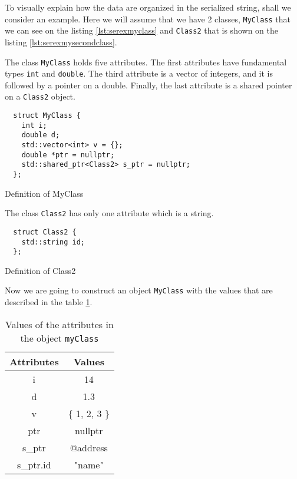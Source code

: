 To visually explain how the data are organized in the serialized string, shall
we consider an example. Here we will assume that we have 2 classes,
\texttt{MyClass} that we can see on the listing \ref{lst:serexmyclass} and
\texttt{Class2} that is shown on the listing
\ref{lst:serexmysecondclass}.

The class \texttt{MyClass} holds five attributes. The first attributes have
fundamental types \texttt{int} and \texttt{double}. The third attribute is a
vector of integers, and it is followed by a pointer on a double. Finally, the
last attribute is a shared pointer on a \texttt{Class2} object.

\begin{listing}[ht!]
\begin{verbatim}
  struct MyClass {
    int i;
    double d;
    std::vector<int> v = {};
    double *ptr = nullptr;
    std::shared_ptr<Class2> s_ptr = nullptr;
  };
\end{verbatim}
\caption{Definition of MyClass}
\label{lst:serexmyclass}
\end{listing}

The class \texttt{Class2} has only one attribute which is a string.

\begin{listing}[ht!]
\begin{verbatim}
  struct Class2 {
    std::string id;
  };
\end{verbatim}
\caption{Definition of Class2}
\label{lst:serexmysecondclass}
\end{listing}

Now we are going to construct an object \texttt{MyClass} with the values that
are described in the table \ref{tbl:serexvals}.

\begin{table}[h!]
\centering
\begin{tabular}{|c|c|}
 \hline
 Attributes & Values \\
 \hline\hline
  i & 14 \\
 \hline
  d & 1.3 \\
 \hline
  v & \{ 1, 2, 3 \} \\
 \hline
  ptr & nullptr \\
 \hline
  s\_ptr & @address \\
 \hline\hline
  s\_ptr.id & "name" \\
 \hline
\end{tabular}
\caption{Values of the attributes in the object \texttt{myClass}}
\label{tbl:serexvals}
\end{table}

